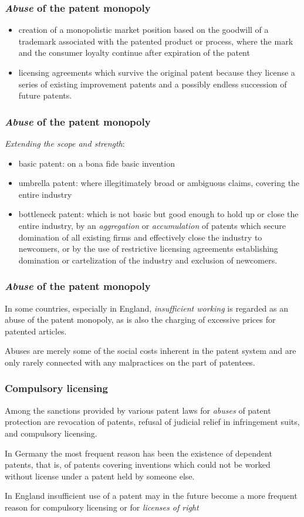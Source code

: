 \begin{frame}
\frametitle{\textit{Abuse} of the patent monopoly}
\begin{itemize}
    \item creation of a monopolistic market position based on the goodwill of a trademark associated with the patented product or process, where the mark and the consumer loyalty continue after expiration of the patent
    \item licensing agreements which survive the original patent because they license a series of existing improvement patents and a possibly endless succession of future patents.
\end{itemize}
\end{frame}

\begin{frame}
\frametitle{\textit{Abuse} of the patent monopoly}
\textit{Extending the scope and strength}:
\begin{itemize}
	\item basic patent: on a bona fide basic invention
    \item umbrella patent: where illegitimately broad or ambiguous claims, covering the entire industry
    \item bottleneck patent: which is not basic but good enough to hold up or close the entire industry, by an \textit{aggregation} or \textit{accumulation} of patents which secure domination of all existing firms and effectively close the industry to newcomers, or by the use of restrictive licensing
agreements establishing domination or cartelization of the industry and exclusion of newcomers.
\end{itemize}
\end{frame}

\begin{frame}
\frametitle{\textit{Abuse} of the patent monopoly}
In some countries, especially in England, \textit{insufficient working} is regarded as an abuse of the patent monopoly, as is also the charging of excessive prices for patented articles.

Abuses are merely some of the social costs inherent in the patent system and are only rarely connected with any malpractices on the part of patentees.
\end{frame}

\begin{frame}
\frametitle{Compulsory licensing}
Among the sanctions provided by various patent laws for \textit{abuses} of patent protection are revocation of patents, refusal of judicial relief in infringement suits, and compulsory licensing.

In Germany the most frequent reason has been the existence of dependent patents, that is, of patents covering inventions which could not be worked without license under a patent held by someone else.

In England insufficient use of a patent may in the future become a more frequent reason for compulsory licensing or for \textit{licenses of right}
\end{frame}



